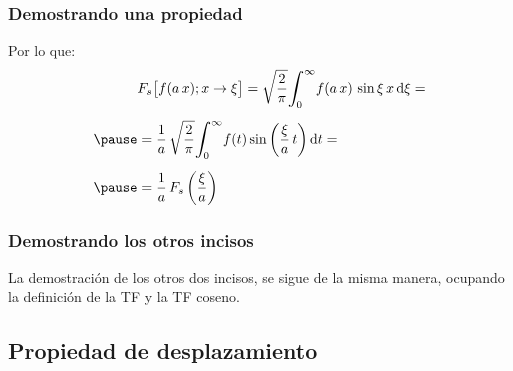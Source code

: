 \begin{frame}
\frametitle{Demostrando una propiedad}
Por lo que:
\pause
\begin{eqnarray*}
\begin{aligned}
&F_{s} \big[ f (a \, x); x \to \xi \big] = \sqrt{\dfrac{2}{\pi}} \scaleint{6ex}_{\bs 0}^{\infty} f (a \, x) \, \sin \xi \, x \dd{\xi} = \\[0.5em] \pause
&= \dfrac{1}{a} \, \sqrt{\dfrac{2}{\pi}} \scaleint{6ex}_{\bs 0}^{\infty} f (t) \sin \left( \dfrac{\xi}{a} \, t \right) \dd{t} = \\[0.5em] \pause
&= \dfrac{1}{a} \, F_{s} \left( \dfrac{\xi}{a} \right)
\end{aligned}
\end{eqnarray*}
\end{frame}
\begin{frame}
\frametitle{Demostrando los otros incisos}
La demostración de los otros dos incisos, se sigue de la misma manera, ocupando la definición de la TF y la TF coseno.
\end{frame}

\subsection{Propiedad de desplazamiento}

